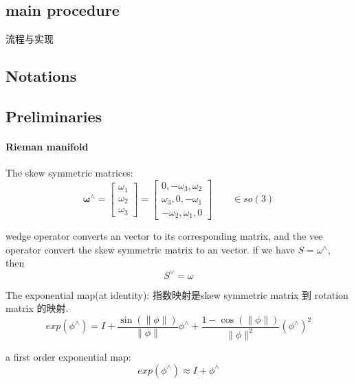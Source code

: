 \documentclass[10pt,a4paper]{article}
\begin{document}
\subsection{main procedure}
流程与实现


\subsection{Notations}
\subsection{Preliminaries}
\paragraph{Rieman manifold}

The skew symmetric matrices:
\begin{equation}
\mathbf{\omega}^\wedge =\begin{bmatrix}
\omega_1 \\
\omega_2 \\
\omega_3
\end{bmatrix}=\begin{bmatrix}
0, -\omega_3, \omega_2 \\
\omega_3, 0, -\omega_1 \\
-\omega_2, \omega_1, 0
\end{bmatrix}\qquad \in so(3)
\end{equation}

wedge operator converts an vector to its corresponding matrix, and the vee operator convert the skew symmetric matrix to an vector. if we have $S=\omega^{\wedge}$, then
\begin{equation}
S^{\vee}=\omega
\end{equation}

The exponential map(at identity): 指数映射是skew symmetric matrix 到 rotation matrix 的映射.
\begin{equation}
exp(\phi^\wedge)=I + \frac{\sin(\|\phi\|)}{\|\phi\|}\phi^\wedge + \frac{1-\cos(\|\phi\|)}{\|\phi\|^2} (\phi^\wedge)^2
\end{equation}

a first order exponential map:
\begin{equation}
exp(\phi^\wedge)\approx I + \phi^\wedge
\end{equation}
\end{document}
